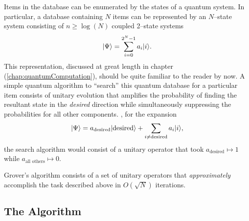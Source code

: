 Items in the database can be enumerated by the states of a quantum system.
In particular, a database containing $N$ items can be represented by an
$N$--state system consisting of $n\ge\log(N)$ coupled 2--state systems
\begin{equation}
{|{\Psi}\rangle} = \sum_{i=0}^{2^N-1} a_i{|{i}\rangle}.
\end{equation}
This representation, discussed at great
length in chapter (\ref{chap:quantumComputation}),
should be quite familiar to the reader by now.
A simple quantum algorithm to ``search'' this quantum database
for a particular item consists of unitary evolution that amplifies 
the probability of finding the resultant state in the \emph{desired}
direction while simultaneously suppressing the probabilities for all
other components. \ie, for the expansion
\begin{equation}
{|{\Psi}\rangle} = a_{\text{desired}}{|{\text{desired}}\rangle} +
\sum_{i\ne\text{desired}} a_i{|{i}\rangle},
\end{equation}
the search algorithm would consist of a unitary operator that took
$a_{\text{desired}}\mapsto 1$ while $a_{\text{all others}}\mapsto 0$.

Grover's algorithm consists of a set of unitary operators that
{\sl approximately} accomplish the task described above in 
$O(\sqrt{N})$ iterations.   


\subsection{The Algorithm}


